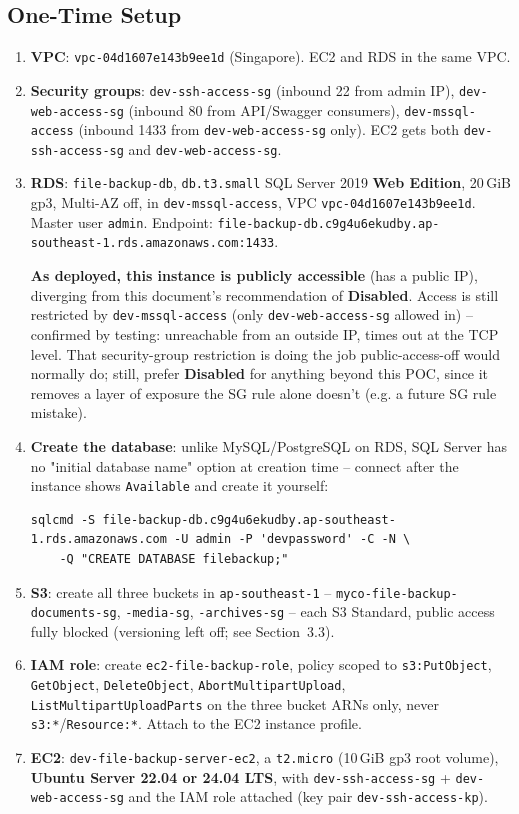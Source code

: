 \documentclass[10pt]{article}
\begin{document}
\subsection{One-Time Setup}
\begin{enumerate}
  \item \textbf{VPC}: \texttt{vpc-04d1607e143b9ee1d} (Singapore). EC2 and RDS in the same VPC.
  \item \textbf{Security groups}: \texttt{dev-ssh-access-sg} (inbound 22 from admin IP), \texttt{dev-web-access-sg} (inbound 80 from API/Swagger consumers), \texttt{dev-mssql-access} (inbound 1433 from \texttt{dev-web-access-sg} only). EC2 gets both \texttt{dev-ssh-access-sg} and \texttt{dev-web-access-sg}.
  \item \textbf{RDS}: \texttt{file-backup-db}, \texttt{db.t3.small} SQL Server 2019 \textbf{Web Edition}, 20\,GiB gp3, Multi-AZ off, in \texttt{dev-mssql-access}, VPC \texttt{vpc-04d1607e143b9ee1d}. Master user \texttt{admin}. Endpoint: \texttt{file-backup-db.c9g4u6ekudby.\allowbreak ap-southeast-1.rds.amazonaws.com:1433}.
  \begin{warnbox}
  \textbf{As deployed, this instance is publicly accessible} (has a public IP), diverging from this document's recommendation of \textbf{Disabled}. Access is still restricted by \texttt{dev-mssql-access} (only \texttt{dev-web-access-sg} allowed in) -- confirmed by testing: unreachable from an outside IP, times out at the TCP level. That security-group restriction is doing the job public-access-off would normally do; still, prefer \textbf{Disabled} for anything beyond this POC, since it removes a layer of exposure the SG rule alone doesn't (e.g. a future SG rule mistake).
  \end{warnbox}
  \item \textbf{Create the database}: unlike MySQL/PostgreSQL on RDS, SQL Server has no "initial database name" option at creation time -- connect after the instance shows \texttt{Available} and create it yourself:
\begin{lstlisting}[style=bashStyle]
sqlcmd -S file-backup-db.c9g4u6ekudby.ap-southeast-1.rds.amazonaws.com -U admin -P 'devpassword' -C -N \
    -Q "CREATE DATABASE filebackup;"
\end{lstlisting}
  \item \textbf{S3}: create all three buckets in \texttt{ap-southeast-1} -- \texttt{myco-file-backup-documents-sg}, \texttt{-media-sg}, \texttt{-archives-sg} -- each S3 Standard, public access fully blocked (versioning left off; see Section~3.3).
  \item \textbf{IAM role}: create \texttt{ec2-file-backup-role}, policy scoped
  to \texttt{s3:PutObject}, \texttt{GetObject}, \texttt{DeleteObject},
  \texttt{AbortMultipartUpload}, \texttt{ListMultipartUploadParts} on the
  three bucket ARNs only, never \texttt{s3:*}/\texttt{Resource:*}. Attach
  to the EC2 instance profile.
  \item \textbf{EC2}: \texttt{dev-file-backup-server-ec2}, a \texttt{t2.micro}
  (10\,GiB gp3 root volume), \textbf{Ubuntu Server 22.04 or 24.04 LTS},
  with \texttt{dev-ssh-access-sg} + \texttt{dev-web-access-sg} and the IAM
  role attached (key pair \texttt{dev-ssh-access-kp}).
\end{enumerate}
\end{document}
